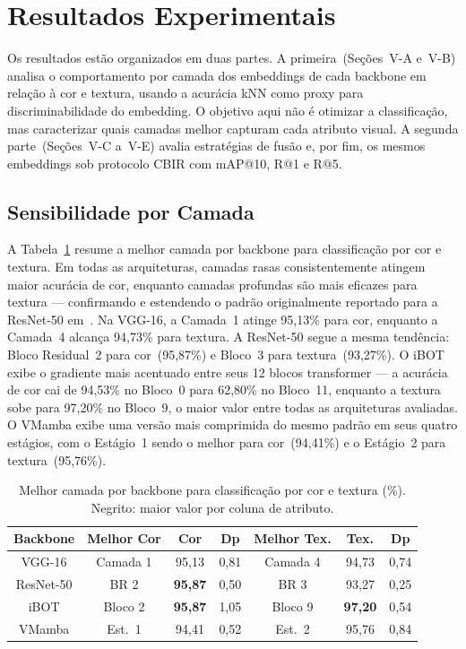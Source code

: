 \documentclass[conference]{IEEEtran}
\begin{document}
\section{Resultados Experimentais}

Os resultados estão organizados em duas partes.
A primeira~(Seções~V-A e~V-B) analisa o comportamento por camada dos
embeddings de cada backbone em relação à cor e textura, usando a acurácia
kNN como proxy para discriminabilidade do embedding.
O objetivo aqui não é otimizar a classificação, mas caracterizar quais
camadas melhor capturam cada atributo visual.
A segunda parte~(Seções~V-C a~V-E) avalia estratégias de fusão e, por
fim, os mesmos embeddings sob protocolo CBIR com mAP@10, R@1 e R@5.

\subsection{Sensibilidade por Camada}

A Tabela~\ref{tab_best_layer} resume a melhor camada por backbone para
classificação por cor e textura.
Em todas as arquiteturas, camadas rasas consistentemente atingem maior
acurácia de cor, enquanto camadas profundas são mais eficazes para textura
— confirmando e estendendo o padrão originalmente reportado para a
ResNet-50 em~\cite{b2}.
Na VGG-16, a Camada~1 atinge 95,13\% para cor, enquanto a Camada~4
alcança 94,73\% para textura.
A ResNet-50 segue a mesma tendência: Bloco Residual~2 para cor~(95,87\%)
e Bloco~3 para textura~(93,27\%).
O iBOT exibe o gradiente mais acentuado entre seus 12 blocos transformer
— a acurácia de cor cai de 94,53\% no Bloco~0 para 62,80\% no Bloco~11,
enquanto a textura sobe para 97,20\% no Bloco~9, o maior valor entre
todas as arquiteturas avaliadas.
O VMamba exibe uma versão mais comprimida do mesmo padrão em seus quatro
estágios, com o Estágio~1 sendo o melhor para cor~(94,41\%) e o
Estágio~2 para textura~(95,76\%).

\begin{table}[htbp]
\caption{Melhor camada por backbone para classificação por cor e textura
         (\%). Negrito: maior valor por coluna de atributo.}
\begin{center}
\begin{tabular}{c|c|c|c|c|c|c}
\hline
\textbf{Backbone} & \textbf{Melhor Cor} & \textbf{Cor} & \textbf{Dp}
                  & \textbf{Melhor Tex.} & \textbf{Tex.} & \textbf{Dp} \\
\hline
VGG-16    & Camada 1 & 95,13          & 0,81 & Camada 4 & 94,73          & 0,74 \\
ResNet-50 & BR 2     & \textbf{95,87} & 0,50 & BR 3     & 93,27          & 0,25 \\
iBOT      & Bloco 2  & \textbf{95,87} & 1,05 & Bloco 9  & \textbf{97,20} & 0,54 \\
VMamba    & Est.\ 1  & 94,41          & 0,52 & Est.\ 2  & 95,76          & 0,84 \\
\hline
\end{tabular}
\label{tab_best_layer}
\end{center}
\end{table}
\end{document}
